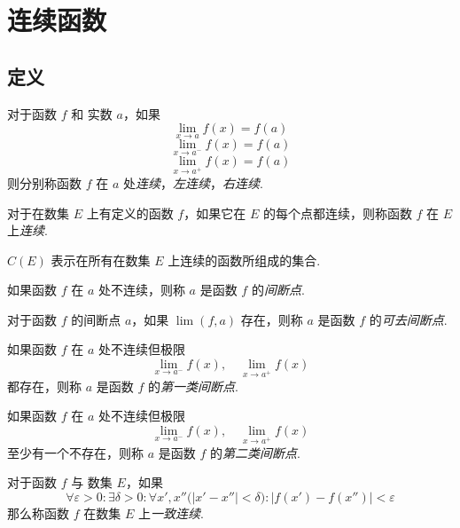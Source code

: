 \section{连续函数}
\subsection{定义}
\begin{definition}
    对于函数 $f$ 和 实数 $a$，如果
    \[\lim_{x \rightarrow a} f(x) = f(a)\]
    \[\lim_{x \rightarrow a^-} f(x) = f(a)\]
    \[\lim_{x \rightarrow a^+} f(x) = f(a)\]
    则分别称函数 $f$ 在 $a$ 处\emph{连续}，\emph{左连续}，\emph{右连续}.
\end{definition}\vspace{9pt}

\begin{definition}
    对于在数集 $E$ 上有定义的函数 $f$，如果它在 $E$ 的每个点都连续，则称函数 $f$ 在 $E$ 上\emph{连续}.
\end{definition}\vspace{9pt}

\begin{definition}
    $C(E)$ 表示在所有在数集 $E$ 上连续的函数所组成的集合.
\end{definition}\vspace{9pt}

\begin{definition}
    如果函数 $f$ 在 $a$ 处不连续，则称 $a$ 是函数 $f$ 的\emph{间断点}.

    对于函数 $f$ 的间断点 $a$，如果 $\lim(f,a)$ 存在，则称 $a$ 是函数 $f$ 的\emph{可去间断点}.
\end{definition}\vspace{9pt}

\begin{subdefinition}
    如果函数 $f$ 在 $a$ 处不连续但极限
    \[\lim_{x \rightarrow a^-} f(x),\quad \lim_{x \rightarrow a^+}f(x)\]
    都存在，则称 $a$ 是函数 $f$ 的\emph{第一类间断点}.
\end{subdefinition}

\begin{subdefinition}
    如果函数 $f$ 在 $a$ 处不连续但极限
    \[\lim_{x \rightarrow a^-}f(x), \quad \lim_{x \rightarrow a^+}f(x)\]
    至少有一个不存在，则称 $a$ 是函数 $f$ 的\emph{第二类间断点}.
\end{subdefinition}\vspace{9pt}

\begin{definition}
    对于函数 $f$ 与 数集 $E$，如果
    \[\forall \varepsilon > 0: \exists \delta > 0: \forall x', x'' \bigl(\lvert x' - x''\rvert < \delta\bigr): \bigl| f(x') - f(x'')\bigr| < \varepsilon\]
    那么称函数 $f$ 在数集 $E$ 上\emph{一致连续}.
\end{definition}

